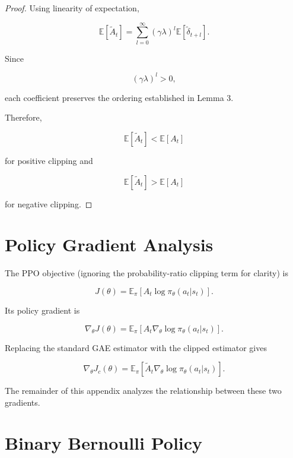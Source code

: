 \documentclass[11pt]{article}
\begin{document}
\begin{proof}

Using linearity of expectation,

\[
\mathbb E[\widetilde A_t]
=
\sum_{l=0}^{\infty}
(\gamma\lambda)^l
\mathbb E[\widetilde\delta_{t+l}].
\]

Since

\[
(\gamma\lambda)^l>0,
\]

each coefficient preserves the ordering established in Lemma 3.

Therefore,

\[
\mathbb E[\widetilde A_t]
<
\mathbb E[A_t]
\]

for positive clipping and

\[
\mathbb E[\widetilde A_t]
>
\mathbb E[A_t]
\]

for negative clipping.

\end{proof}



\section{Policy Gradient Analysis}

The PPO objective (ignoring the probability-ratio clipping term for
clarity) is

\[
J(\theta)
=
\mathbb E_\pi
\left[
A_t
\log\pi_\theta(a_t|s_t)
\right].
\]

Its policy gradient is

\[
\nabla_\theta J(\theta)
=
\mathbb E_\pi
\left[
A_t
\nabla_\theta
\log\pi_\theta(a_t|s_t)
\right].
\]

Replacing the standard GAE estimator with the clipped estimator gives

\[
\nabla_\theta J_c(\theta)
=
\mathbb E_\pi
\left[
\widetilde A_t
\nabla_\theta
\log\pi_\theta(a_t|s_t)
\right].
\]

The remainder of this appendix analyzes the relationship between these
two gradients.


\section{Binary Bernoulli Policy}
\end{document}
